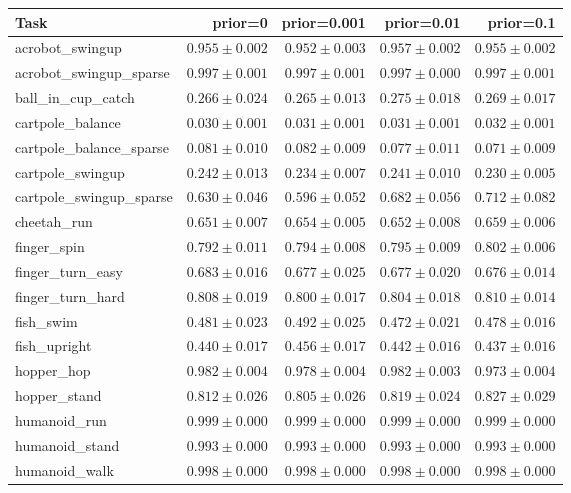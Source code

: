 \begin{tabular}{lrrrr}
  \toprule
  Task & prior=0 & prior=0.001 & prior=0.01 & prior=0.1 \\
  \midrule
  acrobot\_swingup & $0.955\pm0.002$ & $0.952\pm0.003$ & $0.957\pm0.002$ & $0.955\pm0.002$ \\
  acrobot\_swingup\_sparse & $0.997\pm0.001$ & $0.997\pm0.001$ & $0.997\pm0.000$ & $0.997\pm0.001$ \\
  ball\_in\_cup\_catch & $0.266\pm0.024$ & $0.265\pm0.013$ & $0.275\pm0.018$ & $0.269\pm0.017$ \\
  cartpole\_balance & $0.030\pm0.001$ & $0.031\pm0.001$ & $0.031\pm0.001$ & $0.032\pm0.001$ \\
  cartpole\_balance\_sparse & $0.081\pm0.010$ & $0.082\pm0.009$ & $0.077\pm0.011$ & $0.071\pm0.009$ \\
  cartpole\_swingup & $0.242\pm0.013$ & $0.234\pm0.007$ & $0.241\pm0.010$ & $0.230\pm0.005$ \\
  cartpole\_swingup\_sparse & $0.630\pm0.046$ & $0.596\pm0.052$ & $0.682\pm0.056$ & $0.712\pm0.082$ \\
  cheetah\_run & $0.651\pm0.007$ & $0.654\pm0.005$ & $0.652\pm0.008$ & $0.659\pm0.006$ \\
  finger\_spin & $0.792\pm0.011$ & $0.794\pm0.008$ & $0.795\pm0.009$ & $0.802\pm0.006$ \\
  finger\_turn\_easy & $0.683\pm0.016$ & $0.677\pm0.025$ & $0.677\pm0.020$ & $0.676\pm0.014$ \\
  finger\_turn\_hard & $0.808\pm0.019$ & $0.800\pm0.017$ & $0.804\pm0.018$ & $0.810\pm0.014$ \\
  fish\_swim & $0.481\pm0.023$ & $0.492\pm0.025$ & $0.472\pm0.021$ & $0.478\pm0.016$ \\
  fish\_upright & $0.440\pm0.017$ & $0.456\pm0.017$ & $0.442\pm0.016$ & $0.437\pm0.016$ \\
  hopper\_hop & $0.982\pm0.004$ & $0.978\pm0.004$ & $0.982\pm0.003$ & $\mathbf{0.973\pm0.004}$ \\
  hopper\_stand & $0.812\pm0.026$ & $0.805\pm0.026$ & $0.819\pm0.024$ & $0.827\pm0.029$ \\
  humanoid\_run & $0.999\pm0.000$ & $0.999\pm0.000$ & $0.999\pm0.000$ & $0.999\pm0.000$ \\
  humanoid\_stand & $0.993\pm0.000$ & $0.993\pm0.000$ & $0.993\pm0.000$ & $0.993\pm0.000$ \\
  humanoid\_walk & $0.998\pm0.000$ & $\mathbf{0.998\pm0.000}$ & $0.998\pm0.000$ & $0.998\pm0.000$ \\

\end{tabular}
